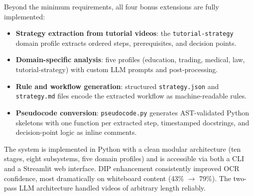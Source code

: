 \documentclass[12pt,a4paper]{article}
\begin{document}
Beyond the minimum requirements, all four bonus extensions are fully implemented:

\begin{itemize}[leftmargin=*]
  \item \textbf{Strategy extraction from tutorial videos}: the \texttt{tutorial-strategy}
    domain profile extracts ordered steps, prerequisites, and decision points.
  \item \textbf{Domain-specific analysis}: five profiles (education, trading, medical,
    law, tutorial-strategy) with custom LLM prompts and post-processing.
  \item \textbf{Rule and workflow generation}: structured \texttt{strategy.json} and
    \texttt{strategy.md} files encode the extracted workflow as machine-readable rules.
  \item \textbf{Pseudocode conversion}: \texttt{pseudocode.py} generates AST-validated
    Python skeletons with one function per extracted step, timestamped docstrings, and
    decision-point logic as inline comments.
\end{itemize}

The system is implemented in Python with a clean modular architecture (ten stages,
eight subsystems, five domain profiles) and is accessible via both a CLI and a Streamlit
web interface. DIP enhancement consistently improved OCR confidence, most dramatically on
whiteboard content (43\% $\to$ 79\%). The two-pass LLM architecture handled videos of
arbitrary length reliably.
\end{document}
